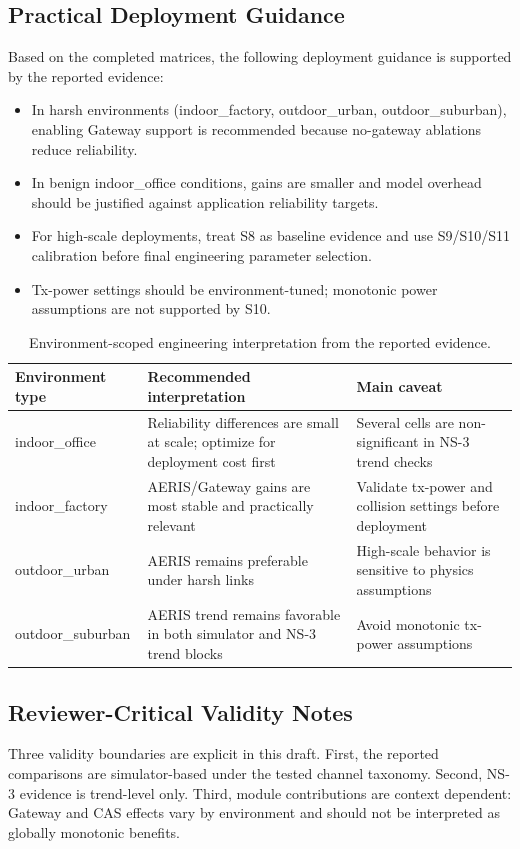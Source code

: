 \documentclass[sensors,article,submit,moreauthors,pdftex]{Definitions/mdpi}
\begin{document}
\subsection*{Practical Deployment Guidance}
Based on the completed matrices, the following deployment guidance is supported by the reported evidence:
\begin{itemize}
\item In harsh environments (indoor\_factory, outdoor\_urban, outdoor\_suburban), enabling Gateway support is recommended because no-gateway ablations reduce reliability.
\item In benign indoor\_office conditions, gains are smaller and model overhead should be justified against application reliability targets.
\item For high-scale deployments, treat S8 as baseline evidence and use S9/S10/S11 calibration before final engineering parameter selection.
\item Tx-power settings should be environment-tuned; monotonic power assumptions are not supported by S10.
\end{itemize}

\begin{table}[H]
\caption{Environment-scoped engineering interpretation from the reported evidence.}
\label{tab:deployment_summary}
\centering
\small
\begin{tabular}{p{} p{} p{}}
\toprule
Environment type & Recommended interpretation & Main caveat \\
\midrule
indoor\_office & Reliability differences are small at scale; optimize for deployment cost first & Several cells are non-significant in NS-3 trend checks \\
indoor\_factory & AERIS/Gateway gains are most stable and practically relevant & Validate tx-power and collision settings before deployment \\
outdoor\_urban & AERIS remains preferable under harsh links & High-scale behavior is sensitive to physics assumptions \\
outdoor\_suburban & AERIS trend remains favorable in both simulator and NS-3 trend blocks & Avoid monotonic tx-power assumptions \\
\bottomrule
\end{tabular}
\normalsize
\end{table}

\subsection*{Reviewer-Critical Validity Notes}
Three validity boundaries are explicit in this draft. First, the reported comparisons are simulator-based under the tested channel taxonomy. Second, NS-3 evidence is trend-level only. Third, module contributions are context dependent: Gateway and CAS effects vary by environment and should not be interpreted as globally monotonic benefits.
\end{document}
